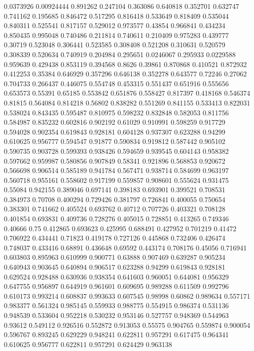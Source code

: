 0.0373926 0.00924444
0.891262 0.247104
0.363086 0.640818
0.352701 0.632747
0.741162 0.195685
0.846472 0.517295
0.816418 0.533649
0.818409 0.535044
0.840311 0.525541
0.817157 0.529012
0.973577 0.43854
0.966841 0.434234
0.850435 0.995048
0.740486 0.211814
0.740611 0.210409
0.975283 0.439777
0.30719 0.523048
0.306441 0.523585
0.308408 0.521208
0.310631 0.520579
0.308339 0.520634
0.740919 0.204984
0.295651 0.0246067
0.295933 0.0229588
0.959639 0.429438
0.853119 0.394568
0.8626 0.39861
0.870868 0.410521
0.872932 0.412253
0.35384 0.646929
0.357296 0.646138
0.352278 0.643577
0.72246 0.27062
0.704733 0.266437
0.446075 0.554748
0.453315 0.551437
0.651916 0.555656
0.653573 0.55391
0.65185 0.553842
0.651876 0.558427
0.817397 0.418168
0.546374 0.81815
0.564084 0.814218
0.56802 0.838282
0.551269 0.841155
0.533413 0.822031
0.538024 0.843435
0.595487 0.810975
0.598232 0.832848
0.582053 0.811756
0.584987 0.835232
0.602816 0.902192
0.61029 0.910991
0.598259 0.917729
0.594028 0.902354
0.619843 0.928181
0.604128 0.937307
0.623288 0.94299
0.610625 0.956777
0.594547 0.91877
0.590834 0.919812
0.587442 0.905102
0.590735 0.903728
0.599393 0.938426
0.594659 0.939545
0.604143 0.958382
0.597662 0.959987
0.580856 0.907849
0.58341 0.921896
0.568853 0.920672
0.566698 0.906514
0.585189 0.941784
0.567471 0.938714
0.584699 0.963197
0.560718 0.955161
0.558602 0.917199
0.559857 0.908601
0.555624 0.931475
0.55084 0.942155
0.389046 0.697141
0.398183 0.693901
0.399521 0.708531
0.384973 0.70708
0.400294 0.729426
0.381797 0.726841
0.400055 0.750654
0.383301 0.741662
0.405524 0.693762
0.40712 0.707726
0.403321 0.708128
0.401854 0.693831
0.409736 0.728276
0.405015 0.728851
0.413265 0.749346
0.40666 0.75
0.412865 0.693623
0.425995 0.688491
0.427952 0.701219
0.41472 0.706922
0.434441 0.71823
0.419178 0.727126
0.445868 0.732406
0.426474 0.748037
0.433416 0.68891
0.436648 0.69592
0.443174 0.708176
0.45056 0.716941
0.603803 0.895963
0.610999 0.900771
0.63888 0.907469
0.639287 0.905234
0.640943 0.903645
0.640894 0.906517
0.623288 0.94299
0.619843 0.928181
0.629524 0.928488
0.630936 0.938354
0.641603 0.960051
0.644081 0.956329
0.647755 0.956897
0.644919 0.961601
0.609695 0.989288
0.611509 0.992796
0.610173 0.993214
0.608837 0.993633
0.607545 0.98998
0.60862 0.989634
0.557171 0.983377
0.561324 0.985145
0.559933 0.988775
0.554915 0.986374
0.531136 0.948539
0.533604 0.952218
0.530232 0.953146
0.527757 0.948369
0.544963 0.93612
0.549112 0.926516
0.552872 0.913053
0.55575 0.904765
0.559874 0.900054
0.596767 0.893245
0.629229 0.948241
0.622811 0.957291
0.617475 0.964341
0.610625 0.956777
0.622811 0.957291
0.624429 0.963138
